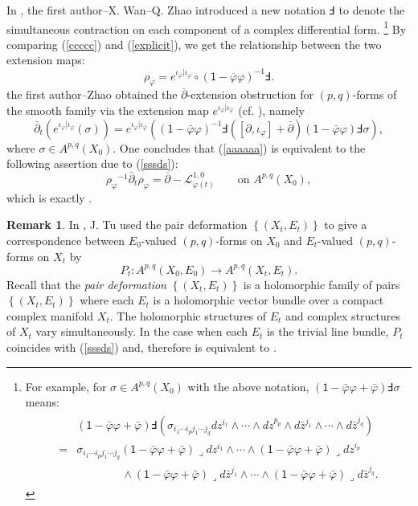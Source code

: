 \documentclass[12pt]{amsart}
\numberwithin{equation}{section}
\theoremstyle{definition}
\theoremstyle{definition}
\theoremstyle{definition}
\newtheorem{remark}  [theorem]     {Remark}
\renewcommand{\1}{\mathsf{1}}
\renewcommand{\>}{\rightarrow}
\newcommand{\p}{\partial}
\newcommand{\bp}{\overline\partial}
\def\p{\partial}
\def\b{\bar}
\def\l{\lrcorner}
\theoremstyle{plain} %
\theoremstyle{plain} %
\theoremstyle{plain} %
\begin{document}
    
	In \cite[Section 2.1]{RWZ21}, the first author--X. Wan--Q. Zhao introduced a new notation $\Finv$ to denote the
	simultaneous contraction on each component of a complex
	differential form. \footnote{For example,  for $\sigma\in A^{p,q}(X_0)$ with the above notation,
		$(\1-\b{\varphi}\varphi+\b{\varphi})\Finv\sigma$ means:
		$$
		\begin{aligned}
			\begin{split}
				&(\1-\b{\varphi}\varphi+\b{\varphi})\Finv(\sigma_{i_1\cdots
					i_p {j_1}\cdots {j_q}}dz^{i_1}\wedge\cdots \wedge dz^{p_p}\wedge
				d\b{z}^{j_1}\wedge\cdots \wedge d\b{z}^{j_q})
				\\
				=&\sigma_{i_1\cdots
					i_p {j_1}\cdots {j_q}}(\1-\b{\varphi}\varphi+\b{\varphi})\l
				dz^{i_1} \wedge\cdots\wedge(\1-\b{\varphi}\varphi +\b{\varphi})\l
				dz^{i_p}	\\&\qquad\quad\quad\wedge(\1-\b{\varphi}\varphi+\b{\varphi})\l
				d\b{z}^{j_1}\wedge\cdots\wedge(\1-\b{\varphi}\varphi+\b{\varphi})\l
				d\b{z}^{j_q}.
			\end{split}
		\end{aligned}
		$$}
	By comparing (\ref{ccccc}) and (\ref{explicit}), we get the relationship between the  two extension maps:
	\begin{equation}\label{sssds}
		\rho_{\varphi}=e^{\iota_{\varphi}|\iota_{\overline{\varphi}}}\circ{\left(\1-\overline\varphi\varphi\right)}^{-1}\Finv.
	\end{equation}
	the first author--Zhao obtained the $\bp$-extension obstruction for $(p,q)$-forms of the smooth family via
	the extension map $e^{\iota_{\varphi}|\iota_{\overline{\varphi}}}$ (cf. \cite[Proposition 2.13]{RZ18}), namely
	\begin{equation}\label{aaaaaa}
		\b{\p}_t(e^{\iota_{\varphi}|\iota_{\b{\varphi}}}(\sigma))
		=e^{\iota_{\varphi}|\iota_{\b{\varphi}}}((\1-\b{\varphi}\varphi)^{-1}\Finv([\p,\iota_{\varphi}]+\b{\p})(\1-\b{\varphi}\varphi)\Finv\sigma),
	\end{equation}
	where $\sigma\in A^{p,q}(X_0)$.
	One concludes that (\ref{aaaaaa}) is equivalent to the following assertion due to (\ref{sssds}):
	$${\rho_{\varphi}}^{-1} \b{\p}_t{\rho_{\varphi}}=\bp-\mathcal{L}^{1,0}_{\varphi(t)} \qquad\text{on}\,\, A^{p,q}(X_0),$$
	which is exactly \cite[Theorem 2.9, the case of $E=\Omega^{p}$]{Xi21b}.
	\begin{remark}
		In \cite{Tu21}, J. Tu used the pair deformation $\left\{(X_t,E_t)\right\}$ to give a correspondence between $E_0$-valued $(p,q)$-forms on $X_0$ and $E_t$-valued $(p,q)$-forms on $X_t$ by
		$$P_t: A^{p,q}(X_0, E_0)\longrightarrow A^{p,q}(X_t,E_t).$$ Recall that the  \textit{pair deformation} $\left\{\left(X_{t}, E_{t}\right)\right\}$ is a holomorphic family of pairs $\left\{\left(X_{t}, E_{t}\right)\right\}$ where each $E_{t}$ is a holomorphic vector bundle over a compact complex manifold $X_{t} .$ The holomorphic structures of $E_{t}$ and complex structures of $X_{t}$ vary simultaneously. In the case when each $E_t$ is the trivial line bundle, $P_t$ coincides with  (\ref{sssds}) and, therefore \cite[Theorem 2]{Tu21} is  equivalent to  \cite[Proposition 2.13]{RZ18}.
	\end{remark}
	
\end{document}
